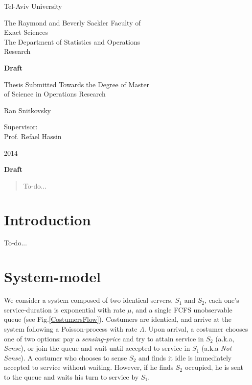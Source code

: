 \documentclass[11pt]{article}
\numberwithin{equation}{section}
\begin{document}
\begin{center} 
\Large {Tel-Aviv University}

\Large {The Raymond and Beverly Sackler Faculty of} \\
\Large {Exact Sciences} \\
\Large {The Department of Statistics and Operations} \\
\Large {Research}

\bigskip
\bigskip
\bigskip

\Large {\bf Draft }

\bigskip
\bigskip
\bigskip
\bigskip

\Large{Thesis Submitted Towards the Degree of Master} \\
\Large {of Science in Operations Research}

\bigskip

\Large {Ran Snitkovsky}

\bigskip
\bigskip
\bigskip

\Large {Supervisor:} \\
\Large {Prof. Refael Hassin}

\bigskip
\bigskip

\Large{2014}

\end{center}

\newpage

\begin{center} \Large {\bf Draft}
\end{center}

\begin{abstract} 

To-do...

\newpage

\end{abstract}

\section{Introduction}

To-do...

\newpage

\section{System-model}

We consider a system composed of two identical servers, $S_{1}$ and $S_{2}$, each one's service-duration is exponential with rate $\mu$, and a single FCFS unobservable queue (see Fig.\ref{CostumersFlow}). Costumers are identical, and arrive at the system following a Poisson-process with rate $\Lambda$. Upon arrival, a costumer chooses one of two options: pay a {\it sensing-price} and try to attain service in $S_{2}$ (a.k.a, {\it Sense}), or join the queue and wait until accepted to service in $S_{1}$ (a.k.a {\it Not-Sense}). A costumer who chooses to sense $S_{2}$ and finds it idle is immediately accepted to service without waiting. However, if he finds $S_{2}$ occupied, he is sent to the queue and waits his turn to service by $S_{1}$.
\end{document}
